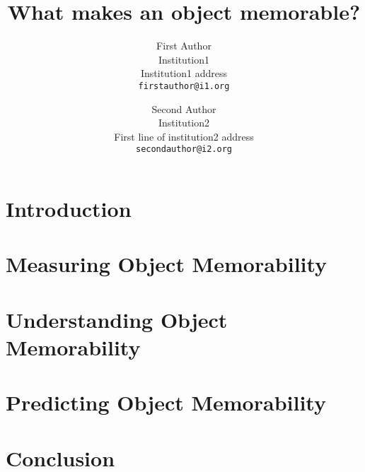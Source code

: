 \documentclass[10pt,twocolumn,letterpaper]{article}
\begin{document}
\title{What makes an object memorable?}

\author{First Author\\
Institution1\\
Institution1 address\\
{\tt\small firstauthor@i1.org}
\and
Second Author\\
Institution2\\
First line of institution2 address\\
{\tt\small secondauthor@i2.org}
}

\maketitle


\begin{abstract}
  
\end{abstract}

\section{Introduction}



\section{Measuring Object Memorability}



\section{Understanding Object Memorability}



\section{Predicting Object Memorability}



\section{Conclusion}


{\small


}
\end{document}
